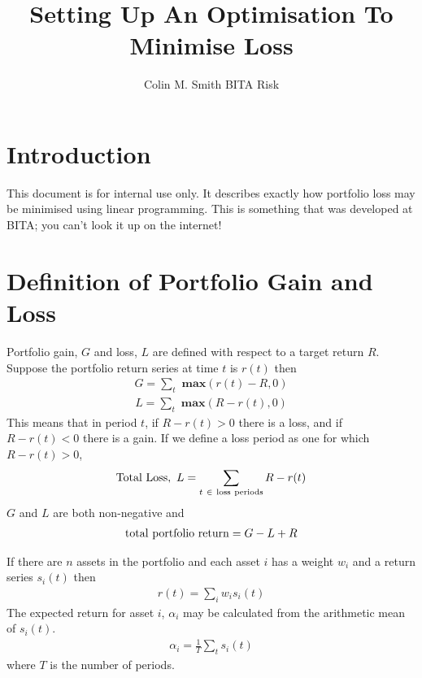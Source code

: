 \documentclass[12pt]{article}
\title{Setting Up An Optimisation To Minimise Loss}
\author{Colin M. Smith BITA Risk}
\begin{document}
\maketitle
\tableofcontents
\pagebreak
\doublespacing
\section{Introduction}
This document is for internal use only. It describes exactly how portfolio loss may be minimised
using linear programming. This is something that was developed at BITA; you can't look it up on the internet!
\section{Definition of Portfolio Gain and Loss}
Portfolio gain, $G$ and loss, $L$ are defined with respect to a target return $R$. Suppose the portfolio return
series at time $t$ is $r(t)$ then
\begin{eqnarray}
    G = \sum_t {\textbf{ max} }(r(t) - R,0)
\end{eqnarray}
\begin{eqnarray}
    L = \sum_t {\textbf{ max} }(R-r(t),0)
\end{eqnarray}
This means that in period $t$, if $R-r(t) > 0$ there is a loss, and if $R-r(t) < 0$ there is a gain.
If we define a loss period as one for which $R-r(t) > 0$,
\begin{eqnarray}
  {\rm Total\ Loss},\ L= \sum_{t\ \in\ \rm loss\ periods} R-r(t)
\end{eqnarray}
$G$ and $L$ are both non-negative and
\begin{eqnarray}
 {\rm   total\ portfolio\ return}= G - L + R
\end{eqnarray}

If there are $n$ assets in the portfolio and each asset $i$
has a weight $w_i$ and a return series $s_i (t)$ then
\begin{eqnarray}
    r(t) = \sum_i w_i s_i(t)
\end{eqnarray}
The expected return for asset $i$, $\alpha_i$ may be calculated from the arithmetic
mean of $s_i(t)$.
\begin{eqnarray}
    \alpha_i = \frac{1} {T} \sum_t s_i(t)
\end{eqnarray}
where $T$ is the number of periods.
\end{document}
